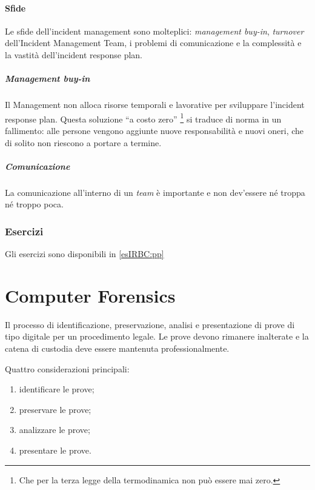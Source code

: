 \subsubsection{Sfide}

Le sfide dell'incident management sono molteplici: 
\textit{management buy-in}, \textit{turnover} dell'Incident Management
Team, i problemi di comunicazione e la complessità e la vastità dell'incident response plan.

\paragraph*{Management buy-in}
Il Management non alloca risorse temporali e lavorative per sviluppare
l'incident response plan. Questa soluzione ``a costo zero''
\footnote{Che per la terza legge della termodinamica non può essere mai
zero.} si traduce di norma in un fallimento: alle persone vengono aggiunte
nuove responsabilità e nuovi oneri, che di solito non riescono a portare
a termine.

\paragraph*{Comunicazione} La comunicazione all'interno di un \textit{team} è
importante e non dev'essere né troppa né troppo poca.


\subsection{Esercizi}

Gli esercizi sono disponibili in \ref{esIRBC:pp}

\chapter{Computer Forensics}
\label{IRBC:cf}

Il processo di identificazione, preservazione, analisi e presentazione di prove
di tipo digitale per un procedimento legale. Le prove devono rimanere inalterate
e la catena di custodia deve essere mantenuta professionalmente.

Quattro considerazioni principali:

\begin{enumerate}
\item identificare le prove;
\item preservare le prove;
\item analizzare le prove;
\item presentare le prove.
\end{enumerate}

